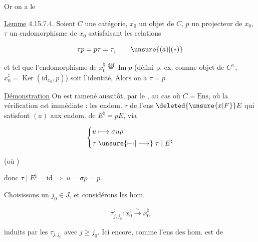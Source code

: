 
Or on a le

\uline{Lemme} 4.15.7.4. Soient $C$ une catégorie, $x_0$ un objet de $C$, $p$ un projecteur de $x_0$, $\tau$ un endomorphisme de $x_0$ satisfaisant les relations

\begingroup\makeatletter\tagsleft@true\makeatother
\[\tau p=p\tau=\tau,\tag*{$\unsure{(a)|(*)}$}\]
\endgroup

et tel que l'endomorphisme de $x_0^\natural\overset{\mathrm{déf}}{=}\operatorname{Im}p$ (défini p. ex. comme objet de $C^\wedge$, $x_0^\natural=\operatorname{Ker}(\mathrm{id}_{x_0},p)$) soit l'identité, Alors on a $\tau=p$.

\uline{Démonstration}  On est ramené aussitôt, par le  , au cas où $C=\mathrm{Ens}$, où la vérification est immédiate : les endom. $\tau$ de l'ens $\deleted{\unsure{x|F}}E$  qui satisfont $(a)$   aux  endom. de $E^\natural=pE$, via

\[\left\{\begin{aligned}u&\longmapsto\sigma u\rho\\ \tau&\mathrel{\unsure{\mapstochar\relbar\mapstochar|\longmapsto}}\tau\mid E^\natural\end{aligned}\right.\]

(où  )

donc $\tau\mid E^\natural=\mathrm{id}\ \Longrightarrow\ u=\sigma\rho=p$.

Choisissons un $j_0\in J$, et considérons les hom.

\[\tau_{j,j_0}^\natural:x_0^\natural\xrightarrow{\sim}x_0^\natural\]

induits par les $\tau_{j,j_0}$ avec $j\geq j_0$. Ici encore, comme l'ens des hom.  est de
